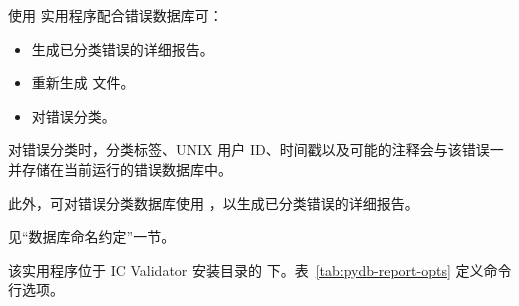 使用  实用程序配合错误数据库可：
\begin{itemize}
  \item 生成已分类错误的详细报告。
  \item 重新生成  文件。
  \item 对错误分类。
\end{itemize}

对错误分类时，分类标签、UNIX 用户 ID、时间戳以及可能的注释会与该错误一并存储在当前运行的错误数据库中。

此外，可对错误分类数据库使用 ，以生成已分类错误的详细报告。

\begin{noteBox}
见``数据库命名约定''一节。
\end{noteBox}

该实用程序位于 IC Validator 安装目录的  下。表~\ref{tab:pydb-report-opts} 定义命令行选项。

